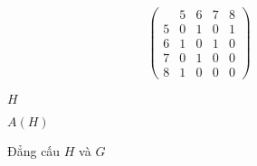 \begin{figure}[h]
\begin{center}
\begin{minipage}[c]{0.4\textwidth}
\begin{center}
\begin{tikzpicture}[thick]
				\end{tikzpicture}
			\end{center}
		\end{minipage}
		\begin{minipage}[c]{0.4\textwidth}
			\begin{center}
				\begin{align*}
					\left(
						\begin{array}{c|cccc}
							 &5&6&7&8\\\hline
							5&0&1&0&1\\
							6&1&0&1&0\\
							7&0&1&0&0\\
							8&1&0&0&0
						\end{array}
					\right)
				\end{align*}
			\end{center}
		\end{minipage}
		\begin{minipage}{0.4\textwidth}\begin{center}$H$\end{center}\end{minipage}
		\begin{minipage}{0.4\textwidth}\begin{center}$A(H)$\end{center}\end{minipage}
	\end{center}
	\caption{Đẳng cấu $H$ và $G$}
	\label{fig:dong-cau-h-va-g}
\end{figure}

